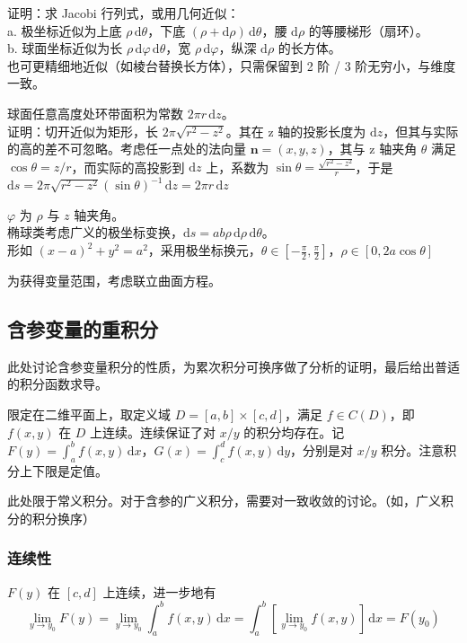 \documentclass[12pt, a4paper, UTF8, openany]{ctexbook}
\newcommand{\dif}{\mathrm{d}}
\newcommand{\sdif}{\,\dif}
\newcommand{\mat}[1]{\mathbf{#1}}
\begin{document}
        证明：求 Jacobi 行列式，或用几何近似：\\
        a. 极坐标近似为上底 $\rho\sdif\theta$，下底 $(\rho + \dif\rho)\sdif\theta$，腰 $\dif\rho$ 的等腰梯形（扇环）。\\
        b. 球面坐标近似为长 $\rho\sdif\varphi\sdif\theta$，宽 $\rho\sdif\varphi$，纵深 $\dif\rho$ 的长方体。\\
        也可更精细地近似（如棱台替换长方体），只需保留到 2 阶 / 3 阶无穷小，与维度一致。

        球面任意高度处环带面积为常数 $2 \pi r \sdif z$。\\
        证明：切开近似为矩形，长 $2 \pi \sqrt{r^2 - z^2}$。其在 z 轴的投影长度为 $\dif z$，但其与实际的高的差不可忽略。考虑任一点处的法向量 $\mat{n} = (x, y, z)$，其与 z 轴夹角 $\theta$ 满足 $\cos\theta = z/r$，而实际的高投影到 $\dif z$ 上，系数为 $\sin\theta = \frac{\sqrt{r^2 - z^2}}{r}$，于是 $\dif s = 2 \pi \sqrt{r^2 - z^2} (\sin\theta)^{-1}\sdif z = 2 \pi r \sdif z$

        $\varphi$ 为 $\rho$ 与 $z$ 轴夹角。\\
        椭球类考虑广义的极坐标变换，$\dif s = ab \rho \sdif\rho \sdif\theta$。\\
        形如 $(x - a)^2 + y^2 = a^2$，采用极坐标换元，$\theta \in [-\frac{\pi}{2}, \frac{\pi}{2}]$，$\rho \in [0, 2a\cos\theta]$

        为获得变量范围，考虑联立曲面方程。

        \subsection{含参变量的重积分}
        此处讨论含参变量积分的性质，为累次积分可换序做了分析的证明，最后给出普适的积分函数求导。

        限定在二维平面上，取定义域 $D = [a, b] \times [c, d]$，满足 $f \in C(D)$，即 $f(x, y)$ 在 $D$ 上连续。连续保证了对 $x/y$ 的积分均存在。记 $F(y) = \int_{a}^{b} f(x, y)\sdif x$，$G(x) = \int_{c}^{d} f(x, y)\sdif y$，分别是对 $x/y$ 积分。注意积分上下限是定值。

        此处限于常义积分。对于含参的广义积分，需要对一致收敛的讨论。（如，广义积分的积分换序）

        \subsubsection{连续性}
        $F(y)$ 在 $[c, d]$ 上连续，进一步地有
        $$\lim_{y \to y_0} F(y) = \lim_{y \to y_0} \int_{a}^{b} f(x, y) \sdif x = \int_{a}^{b} [\lim_{y \to y_0} f(x, y)] \sdif x = F(y_0)$$
\end{document}
